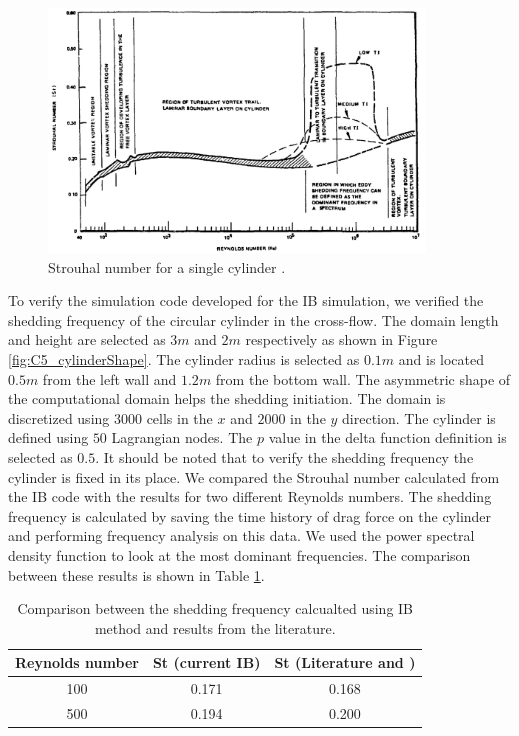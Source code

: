 %
\begin{figure}[H]
    \centering
    \includegraphics[width=10.00cm]{Chapter_5/figure/StrouhalVsReynodsl.png}
    \caption{Strouhal number for a single cylinder \cite{jendrzejczyk1985fluid}.}
    \label{fig:C5_strouhalVSreynoldsNumber}
\end{figure}
%
To verify the simulation code developed for the IB simulation, we verified the shedding frequency of the circular cylinder in the cross-flow. The domain length and height are selected as $3 m$ and $2 m$ respectively as shown in Figure \ref{fig:C5_cylinderShape}. The cylinder radius is selected as $0.1 m$ and is located $0.5 m$ from the left wall and $1.2 m$ from the bottom wall. The asymmetric shape of the computational domain helps the shedding initiation. The domain is discretized using $3000$ cells in the $x$ and $2000$ in the $y$ direction. The cylinder is defined using $50$ Lagrangian nodes. The $p$ value in the delta function definition is selected as $0.5$. It should be noted that to verify the shedding frequency the cylinder is fixed in its place. We compared the Strouhal number calculated from the IB code with the results \cite{mittal2001control} for two different Reynolds numbers. The shedding frequency is calculated by saving the time history of drag force on the cylinder and performing frequency analysis on this data. We used the power spectral density function to look at the most dominant frequencies. The comparison between these results is shown in Table \ref{table:C5_strouhalVerification}.
%
\begin{table}[H]
\centering
\begin{tabular}{c | c | c}
     Reynolds number & St (current IB) & St (Literature \cite{jendrzejczyk1985fluid} and \cite{mittal2001control}) \\ \hline \hline
     100 & 0.171 & 0.168 \\ \hline
     500 & 0.194 & 0.200 \\
\end{tabular}
\caption{Comparison between the shedding frequency calcualted using IB method and results from the literature.}
\label{table:C5_strouhalVerification}
\end{table}
